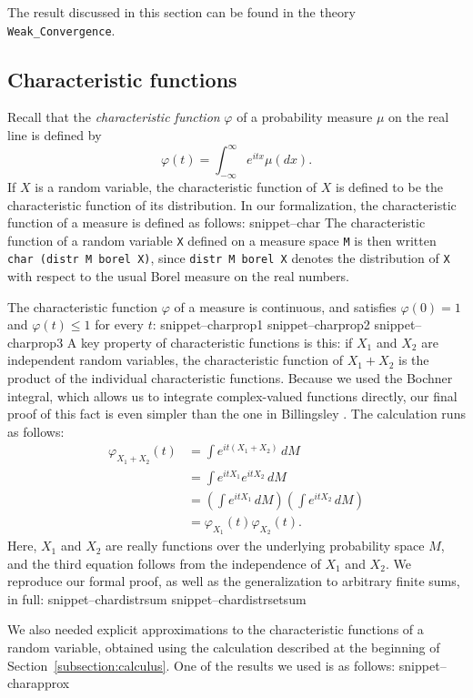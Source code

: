 \documentclass{svjour3}
\newcommand{\ph}{\varphi}
\newcommand{\Snippet}[1]{\csname snippet--#1\endcsname}
\begin{document}
The result discussed in this section can be found in the theory \verb=Weak_Convergence=.

\subsection{Characteristic functions}
\label{subsection:characteristic}

Recall that the \emph{characteristic function} $\ph$ of a probability measure $\mu$ on the real line is defined by
\[
\ph(t) = \int_{-\infty}^{\infty} e^{itx} \mu(dx).
\]
If $X$ is a random variable, the characteristic function of $X$ is defined to be the characteristic function of its distribution.
In our formalization, the characteristic function of a measure is defined as follows:
\Snippet{char}
The characteristic function of a random variable \texttt{X} defined on a measure space \texttt{M} is then written \texttt{char (distr M borel X)}, since \texttt{distr M borel X} denotes the distribution of \texttt{X} with respect to the usual Borel measure on the real numbers.

The characteristic function $\ph$ of a measure is continuous, and satisfies $\ph(0) = 1$ and $\ph(t) \leq 1$ for every $t$:
\Snippet{charprop1}
\Snippet{charprop2}
\Snippet{charprop3}
A key property of characteristic functions is this: if $X_1$ and $X_2$ are independent random variables, the characteristic function of $X_1 + X_2$ is the product of the individual characteristic functions. Because we used the Bochner integral, which allows us to integrate complex-valued functions directly, our final proof of this fact is even simpler than the one in Billingsley \cite{billingsley:95}. The calculation runs as follows:
\begin{align*}
\ph_{X_1 + X_2}(t) &= \int e^{i t (X_1 + X_2)} \, dM  \\
                   &= \int e^{i t X_1} e^{i t X_2} \, dM \\
                   &= \left(\int e^{i t X_1} \, dM\right) \left(\int e^{i t X_2} \, dM\right) \\
                   &= \ph_{X_1}(t) \ph_{X_2}(t).
\end{align*}
Here, $X_1$ and $X_2$ are really functions over the underlying probability space $M$, and the third equation follows from the independence of $X_1$ and $X_2$. We reproduce our formal proof, as well as the generalization to arbitrary finite sums, in full:
\Snippet{chardistrsum}
\Snippet{chardistrsetsum}

We also needed explicit approximations to the characteristic functions of a random variable, obtained using the calculation described at the beginning of Section~\ref{subsection:calculus}. One of the results we used is as follows:
\Snippet{charapprox}
\end{document}

